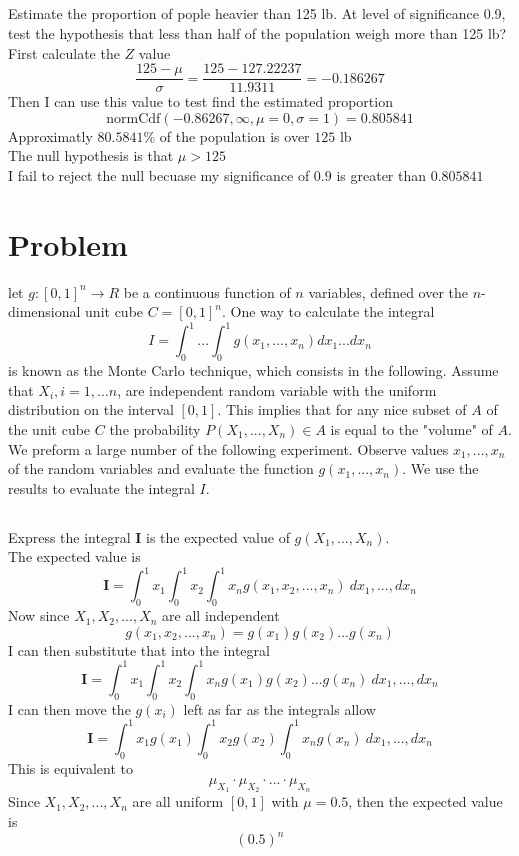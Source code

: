 \documentclass[12pt, letterpaper]{article}
\begin{document}
\subsection{}
Estimate the proportion of pople heavier than 125 lb. At level of significance 0.9, test the
hypothesis that less than half of the population weigh more than 125 lb?
\\
First calculate the $Z$ value
\[
\frac{125-\mu}{\sigma} = \frac{125-127.22237}{11.9311} = -0.186267
\]
Then I can use this value to test find the estimated proportion
\[
\textrm{normCdf}(-0.86267, \infty, \mu=0, \sigma=1) = 0.805841
\]
Approximatly $80.5841\%$ of the population is over $125$ lb
\\
The null hypothesis is that $\mu > 125$
\\
I fail to reject the null becuase my significance of $0.9$ is greater than $0.805841$
\newpage
\section{Problem}
let $g: [0,1]^n \rightarrow R$ be a continuous function of $n$ variables, defined over the $n$-dimensional
unit cube $C = [0, 1]^n$. One way to calculate the integral
\[
I = \int_{0}^{1} ... \int_{0}^{1} g(x_1, ..., x_n) dx_1 ... dx_n
\]
is known as the Monte Carlo technique, which consists in the following.
Assume that $X_i, i = 1, ... n$, are independent random variable with the
uniform distribution on the interval $[0, 1]$. This implies that for any nice
subset of $A$ of the unit cube $C$ the probability $P{(X_1,..., X_n) \in A}$ is
equal to the "volume" of $A$. We preform a large number of the following experiment.
Observe values $x_1, ..., x_n$ of the random variables and evaluate the function $g(x_1, ..., x_n)$.
We use the results to evaluate the integral $I$.
\subsection{}
Express the integral $\textbf{I}$ is the expected value of $g(X_1, ..., X_n)$.
\\
The expected value is
\[
\textbf{I} = \int_{0}^{1}x_1\int_{0}^{1}x_2 \int_{0}^{1}x_ng(x_1, x_2, ..., x_n)\ dx_1,...,dx_n
\]
Now since $X_1, X_2, ..., X_n$ are all independent
\[
g(x_1, x_2,...,x_n) = g(x_1)g(x_2)...g(x_n)
\]
I can then substitute that into the integral
\[
\textbf{I} = \int_{0}^{1}x_1\int_{0}^{1}x_2 \int_{0}^{1}x_ng(x_1)g(x_2)...g(x_n)\ dx_1,...,dx_n
\]
I can then move the $g(x_i)$ left as far as the integrals allow
\[
\textbf{I} = \int_{0}^{1}x_1g(x_1)\int_{0}^{1}x_2g(x_2) \int_{0}^{1}x_ng(x_n)\ dx_1,...,dx_n
\]
This is equivalent to
\[
\mu_{X_1}\cdot \mu_{X_2}\cdot ... \cdot \mu_{X_n}
\]
Since $X_1, X_2, ..., X_n$ are all uniform $[0, 1]$ with $\mu = 0.5$, then the expected value is
\[
(0.5)^n
\]
\end{document}
